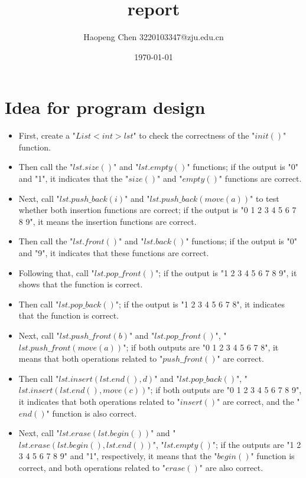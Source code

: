 \documentclass[a4paper]{article}
\begin{document}
\title{report}
\author{Haopeng Chen 3220103347@zju.edu.cn}
\date{\today}
\maketitle
\section*{Idea for program design}
\begin{itemize}
 \item First, create a "$List<int> lst$" to check the correctness of the "$init()$" function.

 \item Then call the "$lst.size()$" and "$lst.empty()$" functions; if the output is "0" and "1", it indicates that the "$size()$" and "$empty()$" functions are correct.

 \item Next, call "$lst.push\_back(i)$" and "$lst.push\_back(move(a))$" to test whether both insertion functions are correct; if the output is "0 1 2 3 4 5 6 7 8 9", it means the insertion functions are correct.

 \item Then call the "$lst.front()$" and "$lst.back()$" functions; if the output is "0" and "9", it indicates that these functions are correct.

 \item Following that, call "$lst.pop\_front()$"; if the output is "1 2 3 4 5 6 7 8 9", it shows that the function is correct.

 \item Then call "$lst.pop\_back()$"; if the output is "1 2 3 4 5 6 7 8", it indicates that the function is correct.

 \item Next, call "$lst.push\_front(b)$" and "$lst.pop\_front()$", "$lst.push\_front(move(a))$"; if both outputs are "0 1 2 3 4 5 6 7 8", it means that both operations related to "$push\_front()$" are correct.

 \item Then call "$lst.insert(lst.end(), d)$" and "$lst.pop\_back()$", "$lst.insert(lst.end(), move(c))$"; if both outputs are "0 1 2 3 4 5 6 7 8 9", it indicates that both operations related to "$insert()$" are correct, and the "$end()$" function is also correct.

 \item Next, call "$lst.erase(lst.begin())$" and "$lst.erase(lst.begin(), lst.end())$", "$lst.empty()$"; if the outputs are "1 2 3 4 5 6 7 8 9" and "1", respectively, it means that the "$begin()$" function is correct, and both operations related to "$erase()$" are also correct.


\end{itemize}
\end{document}

